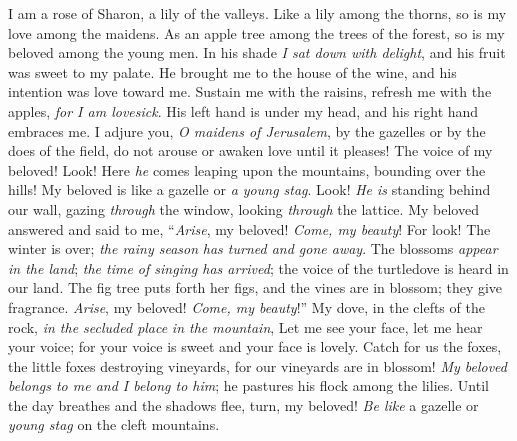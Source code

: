 \begin{biblechapter} %
 I am a rose of Sharon, 
a lily of the valleys.
\verse Like a lily among the thorns, 
so is my love among the maidens.
\verse As an apple tree among the trees of the forest, 
so is my beloved among the young men. 
In his shade \textit{I sat down with delight}, 
and his fruit was sweet to my palate.
 He brought me to the house of the wine, 
and his intention was love toward me.
\verse Sustain me with the raisins, 
refresh me with the apples, 
\textit{for I am lovesick}.
 His left hand is under my head, 
and his right hand embraces me.
\verse I adjure you, \textit{O maidens of Jerusalem}, 
by the gazelles or by the does of the field, 
do not arouse or awaken love until it pleases!
 The voice of my beloved! 
Look! Here \textit{he} comes leaping upon the mountains, 
bounding over the hills!
\verse My beloved is like a gazelle or \textit{a young stag}. 
Look! \textit{He is} standing behind our wall, 
gazing \textit{through} the window, 
looking \textit{through} the lattice.
\verse My beloved answered and said to me, 
“\textit{Arise}, my beloved! \textit{Come, my beauty}!
\verse For look! The winter is over; 
\textit{the rainy season} \textit{has turned and gone away}.
\verse The blossoms \textit{appear} \textit{in the land}; 
\textit{the time of singing has arrived}; 
the voice of the turtledove is heard in our land.
\verse The fig tree puts forth her figs, 
and the vines are in blossom; they give fragrance. 
\textit{Arise}, my beloved! \textit{Come, my beauty}!”
\verse My dove, in the clefts of the rock, 
\textit{in the secluded place} \textit{in the mountain}, 
Let me see your face, 
let me hear your voice; 
for your voice is sweet and your face is lovely.
\verse Catch for us the foxes, 
the little foxes destroying vineyards, 
for our vineyards are in blossom!
 \textit{My beloved belongs to me and I belong to him}; 
he pastures his flock among the lilies.
\verse Until the day breathes and the shadows flee, 
turn, my beloved! 
\textit{Be like} a gazelle or \textit{young stag} on the cleft mountains.
\end{biblechapter}

